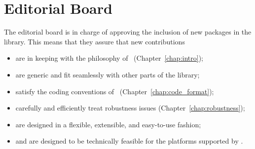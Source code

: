 


\chapter{Editorial Board\label{chap:submission}\label{sec:editorial_board}}


The editorial board is in charge of approving the inclusion of new packages
in the library.  This means that they assure that new contributions
\begin{itemize}
   \item are in keeping with the philosophy of \cgal\ (Chapter~\ref{chap:intro});
   \item are generic and fit seamlessly with other parts of the library;
   \item satisfy the coding conventions of \cgal\ (Chapter~\ref{chap:code_format});
   \item carefully and efficiently treat robustness issues
         (Chapter~\ref{chap:robustness});
   \item are designed in a flexible, extensible, and easy-to-use fashion;
   \item and are designed to be technically feasible for the platforms
         supported by \cgal.
\end{itemize}

